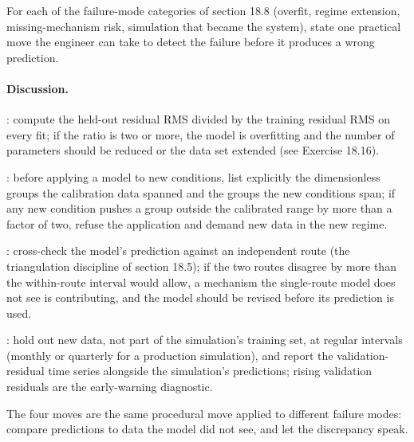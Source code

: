 \begin{exercise}
For each of the failure-mode categories of section 18.8
(overfit, regime extension, missing-mechanism risk, simulation
that became the system), state one practical move the engineer
can take to detect the failure before it produces a wrong
prediction.

\paragraph{Discussion.} : compute the held-out
residual RMS divided by the training residual RMS on every fit;
if the ratio is two or more, the model is overfitting and the
number of parameters should be reduced or the data set extended
(see Exercise 18.16).

: before applying a model to new
conditions, list explicitly the dimensionless groups the
calibration data spanned and the groups the new conditions span;
if any new condition pushes a group outside the calibrated range
by more than a factor of two, refuse the application and demand
new data in the new regime.

: cross-check the model's
prediction against an independent route (the triangulation
discipline of section 18.5); if the two routes disagree by more
than the within-route interval would allow, a mechanism the
single-route model does not see is contributing, and the model
should be revised before its prediction is used.

: hold out new data,
not part of the simulation's training set, at regular intervals
(monthly or quarterly for a production simulation), and report the
validation-residual time series alongside the simulation's
predictions; rising validation residuals are the early-warning
diagnostic.

The four moves are the same procedural move applied to different
failure modes: compare predictions to data the model did not see,
and let the discrepancy speak.
\end{exercise}

